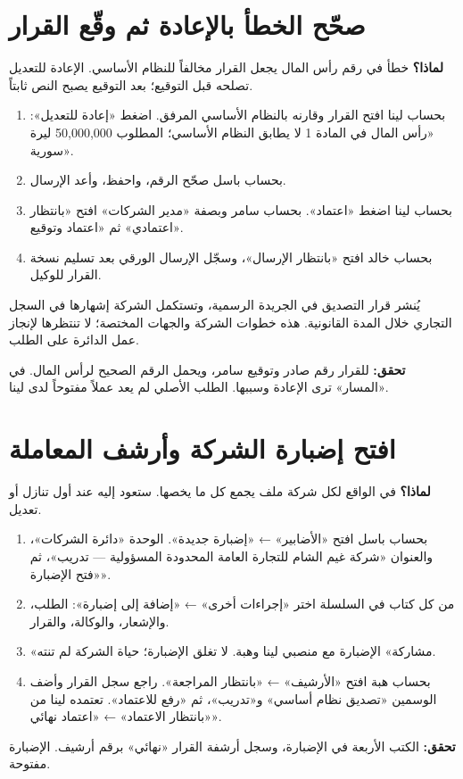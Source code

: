 \section{صحّح الخطأ بالإعادة ثم وقّع القرار}
\label{sec:co-sign}
\textbf{لماذا؟} خطأ في رقم رأس المال يجعل القرار مخالفاً للنظام الأساسي. الإعادة للتعديل تصلحه قبل التوقيع؛ بعد التوقيع يصبح النص ثابتاً.
\begin{enumerate}
\item بحساب لينا افتح القرار وقارنه بالنظام الأساسي المرفق. اضغط «إعادة للتعديل»: «رأس المال في المادة 1 لا يطابق النظام الأساسي؛ المطلوب 50,000,000 ليرة سورية».
\item بحساب باسل صحّح الرقم، واحفظ، وأعد الإرسال.
\item بحساب لينا اضغط «اعتماد». بحساب سامر وبصفة «مدير الشركات» افتح «بانتظار اعتمادي» ثم «اعتماد وتوقيع».
\item بحساب خالد افتح «بانتظار الإرسال»، وسجّل الإرسال الورقي بعد تسليم نسخة القرار للوكيل.
\end{enumerate}
\begin{rcnote}
يُنشر قرار التصديق في الجريدة الرسمية، وتستكمل الشركة إشهارها في السجل التجاري خلال المدة القانونية. هذه خطوات الشركة والجهات المختصة؛ لا تنتظرها لإنجاز عمل الدائرة على الطلب.
\end{rcnote}
\textbf{تحقق:} للقرار رقم صادر وتوقيع سامر، ويحمل الرقم الصحيح لرأس المال. في «المسار» ترى الإعادة وسببها. الطلب الأصلي لم يعد عملاً مفتوحاً لدى لينا.

\section{افتح إضبارة الشركة وأرشف المعاملة}
\label{sec:co-dossier}
\textbf{لماذا؟} في الواقع لكل شركة ملف يجمع كل ما يخصها. ستعود إليه عند أول تنازل أو تعديل.
\begin{enumerate}
\item بحساب باسل افتح «الأضابير» ← «إضبارة جديدة». الوحدة «دائرة الشركات»، والعنوان «شركة غيم الشام للتجارة العامة المحدودة المسؤولية — تدريب»، ثم «فتح الإضبارة».
\item من كل كتاب في السلسلة اختر «إجراءات أخرى» ← «إضافة إلى إضبارة»: الطلب، والإشعار، والوكالة، والقرار.
\item «مشاركة» الإضبارة مع منصبي لينا وهبة. لا تغلق الإضبارة؛ حياة الشركة لم تنته.
\item بحساب هبة افتح «الأرشيف» ← «بانتظار المراجعة». راجع سجل القرار وأضف الوسمين «تصديق نظام أساسي» و«تدريب»، ثم «رفع للاعتماد». تعتمده لينا من «بانتظار الاعتماد» ← «اعتماد نهائي».
\end{enumerate}
\textbf{تحقق:} الكتب الأربعة في الإضبارة، وسجل أرشفة القرار «نهائي» برقم أرشيف. الإضبارة مفتوحة.

